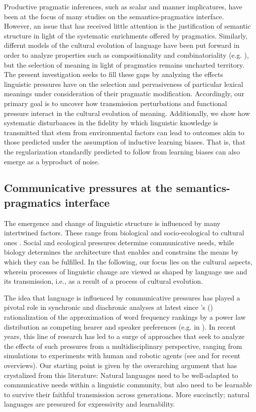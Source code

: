 \documentclass[a4paper]{article}
\newcommand{\citeposs}[2][]{\citeauthor{#2}'s (\citeyear[#1]{#2})}
\begin{document}
Productive pragmatic inferences, such as scalar and manner implicatures, have been at the focus of many studies on the semantics-pragmatics interface. However, an issue that has received little attention is the justification of semantic structure in light of the systematic enrichments offered by pragmatics. Similarly, differnt models of the cultural evolution of language have been put forward in order to analyze properties such as compositionality and combinatoriality (e.g. \citealt{kirby+etal:2015,verhoef+etal:2014}), but the selection of meaning in light of pragmatics remains uncharted territory. The present investigation seeks to fill these gaps by analyzing the effects linguistic pressures have on the selection and pervasiveness of particular lexical meanings under consideration of their pragmatic modification. Accordingly, our primary goal is to uncover how transmission perturbations and functional pressure interact in the cultural evolution of meaning. Additionally, we show how systematic disturbances in the fidelity by which linguistic knowledge is transmitted that stem from environmental factors can lead to outcomes akin to those predicted under the assumption of inductive learning biases. That is, that the regularization standardly predicted to follow from learning biases can also emerge as a byproduct of noise.


\subsection{Communicative pressures at the semantics-pragmatics interface}
The emergence and change of linguistic structure is influenced by many intertwined factors. These range from biological and socio-ecological to cultural ones \citep{steels:2011}. Social and ecological pressures determine communicative needs, while biology determines the architecture that enables and constrains the means by which they can be fulfilled. In the following, our focus lies on the cultural aspects, wherein processes of linguistic change are viewed as shaped by language use and its transmission, i.e., as a result of a process of cultural evolution. 

The idea that language is influenced by communicative pressures has played a pivotal role in synchronic and diachronic analyses at latest since \citeposs{zipf:1949} rationalization of the approximation of word frequency rankings by a power law distribution as competing hearer and speaker preferences (e.g. in \citealt{martinet:1962, horn:1984,jaeger+vRooij:2007,jaeger:2007, piantadosi:2014,kirby+etal:2015}). In recent years, this line of research has led to a surge of approaches that seek to analyze the effects of such pressures from a multidisciplinary perspective, ranging from simulations to experiments with human and robotic agents (see \citealt{steels:2015} and \citealt{tamariz+kirby:2016} for recent overviews). Our starting point is given by the overarching argument that has crystalized from this literature: Natural languages need to be well-adapted to communicative needs within a linguistic community, but also need to be learnable to survive their faithful transmission across generations. More succinctly; natural languages are pressured for expressivity and learnability.   
\end{document}
